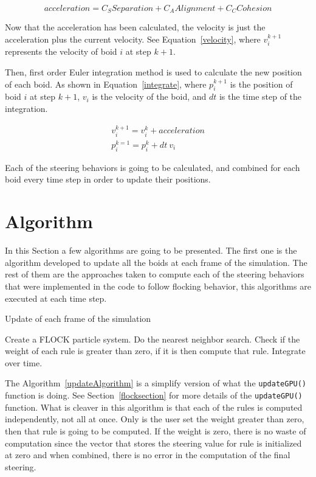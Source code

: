 \begin{equation}
\label{combine}
acceleration = C_S Separation  + C_A Alignment  + C_C Cohesion 
\end{equation}

Now that the acceleration has been calculated, the velocity is just the acceleration plus the current velocity. See Equation~\ref{velocity}, where $v_i^{k+1}$ represents the velocity of boid $i$ at step $k+1$. 

Then, first order Euler integration method is used  to calculate the new position of each boid. As shown in Equation~\ref{integrate}, where $p_i^{k+1}$ is the position of boid $i$ at step $k+1$, $v_i$ is the velocity of the boid, and $dt$ is the time step of the integration.

\begin{align}
\label{velocity}
v_i^{k+1} = v_i^k + acceleration\\
\label{integrate}
p_i^{k=1} = p_i^k + dt~ v_i
\end{align}

Each of the steering behaviors is going to be calculated, and combined for each boid every time step in order to update their positions.

\section{Algorithm}

In this Section a few algorithms are going to be presented. The first one is the algorithm developed to update all the boids at each frame of the simulation. The rest of them are the approaches taken to compute each of the steering behaviors that were implemented in the code to follow flocking behavior, this algorithms are executed at each time step.


\begin{algorithm}
\caption{Update of each frame of the simulation}
\label{updateAlgorithm}
\begin{algorithmic}
\STATE Create a FLOCK particle system.
\STATE Do the nearest neighbor search.
\STATE Check if the weight of each rule is greater than zero, if it is then compute that rule.
\STATE Integrate over time.
\ENDFOR
\end{algorithmic}
\end{algorithm}

The Algorithm~\ref{updateAlgorithm} is a simplify version of what the \texttt{updateGPU()} function is doing. See Section~\ref{flocksection} for more details of the \texttt{updateGPU()} function. What is cleaver in this algorithm is that each of the rules is computed independently, not all at once. Only is the user set the weight greater than zero, then that rule is going to be computed. If the weight is zero, there is no waste of computation since the vector that stores the steering value for rule is initialized at zero and when combined, there is no error in the computation of the final steering.

